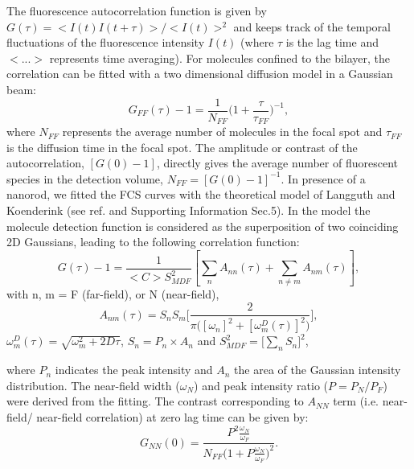 The fluorescence autocorrelation function is given by $G(\tau)=<I(t)I(t+\tau)>/<I(t)>^2$ and keeps track of the temporal fluctuations of the fluorescence intensity $I(t)$ (where $\tau$ is the lag time and $<...>$ represents time averaging).
For molecules confined to the bilayer, the correlation can be fitted with a two dimensional diffusion model in a Gaussian beam\cite{korlach1999characterization}:
\begin{equation}
	G_{FF}(\tau)-1 = \frac{1}{N_{FF}}\bigg(1+\frac{\tau}{\tau_{FF}} \bigg)^{-1},
	\label{eq:2D-gauss-diffusion}
\end{equation}
where $N_{FF}$ represents the average number of molecules in the focal spot and $\tau_{FF}$ is the diffusion time in the focal spot.
The amplitude or contrast of the autocorrelation, $[G(0)-1]$, directly gives the average number of fluorescent species in the detection volume, $N_{FF}=[G(0)-1]^{-1}$.
In presence of a nanorod, we fitted the FCS curves with the theoretical model of Langguth and Koenderink (see ref.\cite{langguth2014simple} and Supporting Information Sec.5).
In the model the molecule detection function is considered as the superposition of two coinciding 2D Gaussians, leading to the following correlation function:
\begin{equation}
	G(\tau)-1 = \frac{1}{<C>S_{MDF}^2}[\sum_{n}A_{nn}(\tau) + \sum_{n\neq m}A_{nm}(\tau)],
	\label{eqm:far-near-gauss}
\end{equation}
with n, m = F (far-field), or N (near-field),
\begin{equation}
	A_{nm}(\tau)=S_nS_m\Bigg[\frac{2}{\pi\Big([\omega_n]^2 + [\omega_m^D(\tau)]^2 \Big)}\Bigg] ,
	\label{eqm:area-gauss}
\end{equation}
$\omega_m^D(\tau)=\sqrt{\omega_m^2 + 2D\tau}$, $S_n=P_n\times A_n$ and $S_{MDF}^2=\Big[\sum_{n}S_n\Big]^2$,


where $P_n$ indicates the peak intensity and $A_n$ the area of the Gaussian intensity distribution.
The near-field width ($\omega_N$) and peak intensity ratio ($P=P_N/P_F$) were derived from the fitting. 
The contrast corresponding to $A_{NN}$ term (i.e. near-field/ near-field correlation) at zero lag time can be given by:
\begin{equation}
	G_{NN}(0) = \frac{P^2\frac{\omega_N}{\omega_F}} {N_{FF}\Big(1+P\frac{\omega_N}{\omega_F}\Big)^2}.
	\label{eqm:contrast_enhnc}
\end{equation}


